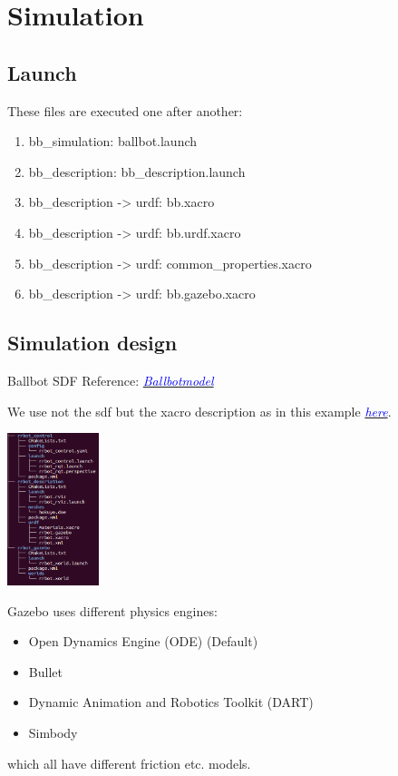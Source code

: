 \documentclass[twoside,colorback,accentcolor=tud4c,11pt]{tudreport}
\newcommand{\mylink}[2] {	\hyperlink{#1}{	\textit{\textcolor{blue}{#2}}}}
\begin{document}
\chapter{Simulation}

\section{Launch}
These files are executed one after another:
\begin{enumerate}
	\item bb\_simulation: ballbot.launch
	\item bb\_description: bb\_description.launch
	\item bb\_description -> urdf: bb.xacro
	\item bb\_description -> urdf: bb.urdf.xacro
	\item bb\_description -> urdf: common\_properties.xacro
	\item bb\_description -> urdf: bb.gazebo.xacro
\end{enumerate}

\section{Simulation design}

Ballbot SDF Reference:
\mylink{https://bitbucket.org/osrf/gazebo/issues/2335/how-to-set-the-friction-of-ballbot-the}{Ballbotmodel} 

We use not the sdf but the xacro description as in this example \mylink{http://gazebosim.org/tutorials/?tut=ros_urdf}{here}.

\begin{center}
		\includegraphics[width=0.2\textwidth]{img/filestructure.png} 
\end{center}

Gazebo uses different physics engines:\\
\begin{itemize}
	\item Open Dynamics Engine (ODE) (Default)
	\item Bullet
	\item Dynamic Animation and Robotics Toolkit (DART)
	\item Simbody
\end{itemize}
 which all have different friction etc. models.
\end{document}
